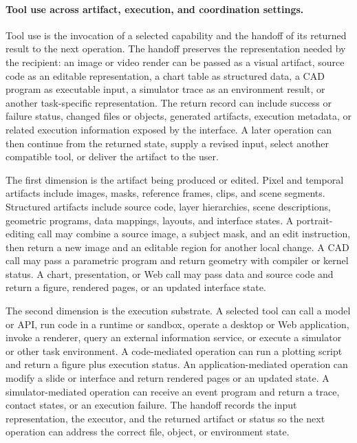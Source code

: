 \paragraph{Tool use across artifact, execution, and coordination settings.}
Tool use is the invocation of a selected capability and the handoff of its returned result to the next operation. The handoff preserves the representation needed by the recipient: an image or video render can be passed as a visual artifact, source code as an editable representation, a chart table as structured data, a CAD program as executable input, a simulator trace as an environment result, or another task-specific representation. The return record can include success or failure status, changed files or objects, generated artifacts, execution metadata, or related execution information exposed by the interface. A later operation can then continue from the returned state, supply a revised input, select another compatible tool, or deliver the artifact to the user.

The first dimension is the artifact being produced or edited. Pixel and temporal artifacts include images, masks, reference frames, clips, and scene segments. Structured artifacts include source code, layer hierarchies, scene descriptions, geometric programs, data mappings, layouts, and interface states. A portrait-editing call may combine a source image, a subject mask, and an edit instruction, then return a new image and an editable region for another local change. A CAD call may pass a parametric program and return geometry with compiler or kernel status. A chart, presentation, or Web call may pass data and source code and return a figure, rendered pages, or an updated interface state.

The second dimension is the execution substrate. A selected tool can call a model or API, run code in a runtime or sandbox, operate a desktop or Web application, invoke a renderer, query an external information service, or execute a simulator or other task environment. A code-mediated operation can run a plotting script and return a figure plus execution status. An application-mediated operation can modify a slide or interface and return rendered pages or an updated state. A simulator-mediated operation can receive an event program and return a trace, contact states, or an execution failure. The handoff records the input representation, the executor, and the returned artifact or status so the next operation can address the correct file, object, or environment state.

